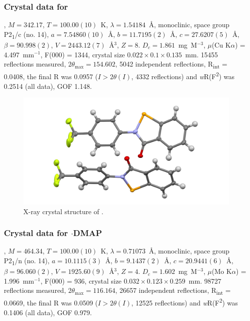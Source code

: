 \begin{refsection}
\subsubsection{Crystal data for \texorpdfstring{}{C14 H8 F3 N O Se}}
, $M=342.17$, $T=100.00(10)$~K, $\lambda=1.54184$~\AA, monoclinic, space group P2\textsubscript{1}/c (no. 14), $a = 7.54860(10)$~\AA, $b = 11.7195(2)$~\AA, $c = 27.6207(5)$~\AA, $\beta = 90.998(2)$\degree, $V = 2443.12(7)$~\AA$^{3}$, $Z = 8$. $D_{c}= 1.861$~mg~M$^{-3}$, $\mu$(Cu K$\alpha$) = 4.497~mm$^{-1}$, F(000) = 1344, crystal size $0.022 \times 0.1 \times 0.135$~mm. 15455 reflections measured, $2\theta_{\max}=154.602$\degree, 5042 independent reflections, R\textsubscript{int} = 0.0408, the final R was 0.0957 ($I > 2\theta(I)$, 4332 reflections) and \textit{w}R(F\textsuperscript{2}) was 0.2514 (all data), GOF 1.148.

\begin{figure}
  \includegraphics[width=0.6\linewidth]{Figures/ebs-4cf3-xtal.pdf}
  \caption{X-ray crystal structure of \texorpdfstring{}{C14 H8 F3 N O Se}.}
\end{figure}

\subsubsection{Crystal data for \texorpdfstring{$ \cdot $DMAP}{C21 H18 F3 N3 O Se}}
, $M=464.34$, $T=100.00(10)$~K, $ \lambda=0.71073 $~\AA, monoclinic, space group P2\textsubscript{1}/n (no. 14), $a = 10.1115(3)$~\AA, $b = 9.1437(2)$~\AA, $c = 20.9441(6)$~\AA, $\beta = 96.060(2)$\degree, $V = 1925.60(9)$~\AA$^{3}$, $Z = 4$. $D_{c}= 1.602$~mg~M$^{-3}$, $\mu$(Mo K$\alpha$) = 1.996~mm$^{-1}$, F(000) = 936, crystal size $0.032 \times 0.123 \times 0.259$~mm. 98727 reflections measured, $2\theta_{\max}=116.164$\degree, 26657 independent reflections, R\textsubscript{int} = 0.0669, the final R was 0.0509 ($I > 2\theta(I)$, 12525 reflections) and \textit{w}R(F\textsuperscript{2}) was 0.1406 (all data), GOF 0.979.


\end{refsection}
